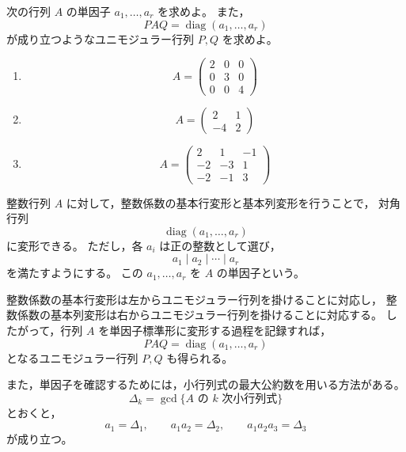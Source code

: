 
\begin{exercise}
	次の行列 \(A\) の単因子 \(a_1,\ldots,a_r\) を求めよ。
	また，
	\[
	PAQ=\operatorname{diag}(a_1,\ldots,a_r)
	\]
	が成り立つようなユニモジュラー行列 \(P,Q\) を求めよ。
	
	\begin{enumerate}
		\item
		\[
		A=
		\begin{pmatrix}
			2 & 0 & 0\\
			0 & 3 & 0\\
			0 & 0 & 4
		\end{pmatrix}
		\]
		
		\item
		\[
		A=
		\begin{pmatrix}
			2 & 1\\
			-4 & 2
		\end{pmatrix}
		\]
		
		\item
		\[
		A=
		\begin{pmatrix}
			2 & 1 & -1\\
			-2 & -3 & 1\\
			-2 & -1 & 3
		\end{pmatrix}
		\]
	\end{enumerate}
\end{exercise}

\begin{background}
	整数行列 \(A\) に対して，整数係数の基本行変形と基本列変形を行うことで，
	対角行列
	\[
	\operatorname{diag}(a_1,\ldots,a_r)
	\]
	に変形できる。
	ただし，各 \(a_i\) は正の整数として選び，
	\[
	a_1\mid a_2\mid \cdots \mid a_r
	\]
	を満たすようにする。
	この \(a_1,\ldots,a_r\) を \(A\) の単因子という。
	
	整数係数の基本行変形は左からユニモジュラー行列を掛けることに対応し，
	整数係数の基本列変形は右からユニモジュラー行列を掛けることに対応する。
	したがって，行列 \(A\) を単因子標準形に変形する過程を記録すれば，
	\[
	PAQ=\operatorname{diag}(a_1,\ldots,a_r)
	\]
	となるユニモジュラー行列 \(P,Q\) も得られる。
	
	また，単因子を確認するためには，小行列式の最大公約数を用いる方法がある。
	\[
	\Delta_k
	=
	\gcd\{\text{\(A\) の \(k\) 次小行列式}\}
	\]
	とおくと，
	\[
	a_1=\Delta_1,
	\qquad
	a_1a_2=\Delta_2,
	\qquad
	a_1a_2a_3=\Delta_3
	\]
	が成り立つ。
\end{background}

